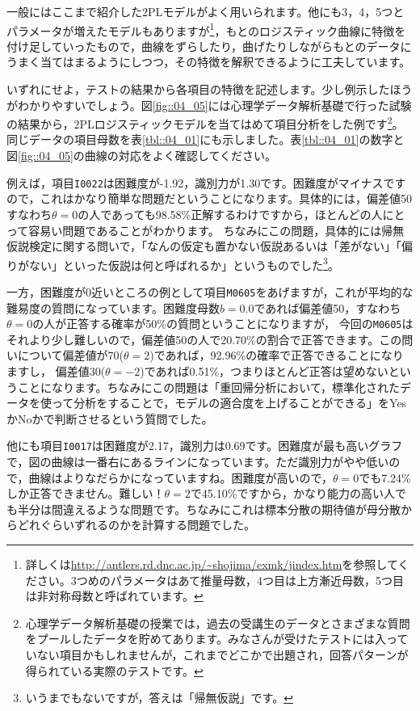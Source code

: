 \documentclass{ltjsbook}
\begin{document}
一般にはここまで紹介した2PLモデルがよく用いられます。他にも3，4，5つとパラメータが増えたモデルもありますが\footnote{詳しくは\url{http://antlers.rd.dnc.ac.jp/~shojima/exmk/jindex.htm}を参照してください。3つめのパラメータはあて推量母数，4つ目は上方漸近母数，5つ目は非対称母数と呼ばれています。}，もとのロジスティック曲線に特徴を付け足していったもので，曲線をずらしたり，曲げたりしながらもとのデータにうまく当てはまるようにしつつ，その特徴を解釈できるように工夫しています。

いずれにせよ，テストの結果から各項目の特徴を記述します。少し例示したほうがわかりやすいでしょう。図\ref{fig::04_05}には心理学データ解析基礎で行った試験の結果から，2PLロジスティックモデルを当てはめて項目分析をした例です\footnote{心理学データ解析基礎の授業では，過去の受講生のデータとさまざまな質問をプールしたデータを貯めてあります。みなさんが受けたテストには入っていない項目かもしれませんが，これまでどこかで出題され，回答パターンが得られている実際のテストです。}。同じデータの項目母数を表\ref{tbl::04_01}にも示しました。表\ref{tbl::04_01}の数字と図\ref{fig::04_05}の曲線の対応をよく確認してください。

例えば，項目\texttt{I0022}は困難度が-1.92，識別力が1.30です。困難度がマイナスですので，これはかなり簡単な問題だということになります。具体的には，偏差値50すなわち$\theta=0$の人であっても98.58\%正解するわけですから，ほとんどの人にとって容易い問題であることがわかります。
ちなみにこの問題，具体的には帰無仮説検定に関する問いで，「なんの仮定も置かない仮説あるいは「差がない」「偏りがない」といった仮説は何と呼ばれるか」というものでした\footnote{いうまでもないですが，答えは「帰無仮説」です。}。

一方，困難度が0近いところの例として項目\texttt{M0605}をあげますが，これが平均的な難易度の質問になっています。困難度母数$b=0.0$であれば偏差値50，すなわち$\theta=0$の人が正答する確率が50\%の質問ということになりますが，
今回の\texttt{M0605}はそれより少し難しいので，偏差値50の人で20.70\%の割合で正答できます。この問いについて偏差値が70($\theta=2$)であれば，92.96\%の確率で正答できることになりますし，
偏差値30($\theta=-2$)であれば0.51\%，つまりほとんど正答は望めないということになります。ちなみにこの問題は「重回帰分析において，標準化されたデータを使って分析をすることで，モデルの適合度を上げることができる」をYesかNoかで判断させるという質問でした。

他にも項目\texttt{I0017}は困難度が2.17，識別力は0.69です。困難度が最も高いグラフで，図の曲線は一番右にあるラインになっています。ただ識別力がやや低いので，曲線はよりなだらかになっていますね。困難度が高いので，$\theta=0$でも7.24\%しか正答できません。難しい！$\theta=2$で45.10\%ですから，かなり能力の高い人でも半分は間違えるような問題です。ちなみにこれは標本分散の期待値が母分散からどれぐらいずれるのかを計算する問題でした。
\end{document}
